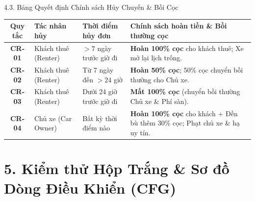 \documentclass[aspectratio=169,10pt]{beamer}
\begin{document}
\begin{frame}{4.3. Bảng Quyết định Chính sách Hủy Chuyến \& Bồi Cọc}
  \begin{table}[ht]
    \centering\footnotesize
    \begin{tabularx}{\textwidth}{cllX}
      \toprule
      \textbf{Quy tắc} & \textbf{Tác nhân hủy} & \textbf{Thời điểm hủy đơn} & \textbf{Chính sách hoàn tiền \& Bồi thường cọc} \\
      \midrule
      \textbf{CR-01} & Khách thuê (Renter) & $> 7$ ngày trước giờ đi & \textbf{Hoàn 100\% cọc} cho khách thuê; Xe mở lại lịch trống. \\
      \textbf{CR-02} & Khách thuê (Renter) & Từ 7 ngày đến $> 24$ giờ & \textbf{Hoàn 50\% cọc}; 50\% cọc chuyển bồi thường cho Chủ xe. \\
      \textbf{CR-03} & Khách thuê (Renter) & Dưới 24 giờ trước giờ đi & \textbf{Mất 100\% cọc} (chuyển bồi thường Chủ xe \& Phí sàn). \\
      \textbf{CR-04} & Chủ xe (Car Owner) & Bất kỳ thời điểm nào & \textbf{Hoàn 100\% cọc} cho khách + Đền bù thêm 30\% cọc; Phạt chủ xe \& hạ uy tín. \\
      \bottomrule
    \end{tabularx}
  \end{table}
\end{frame}

\section{5. Kiểm thử Hộp Trắng \& Sơ đồ Dòng Điều Khiển (CFG)}
\end{document}
